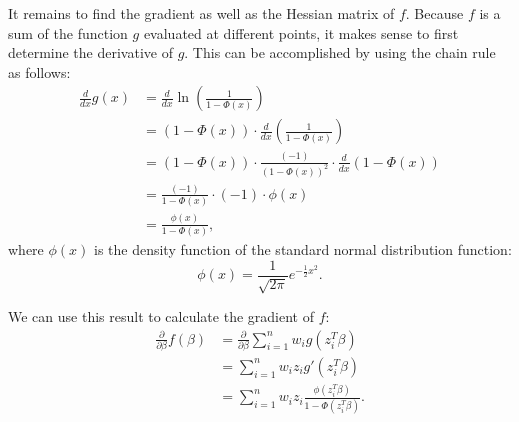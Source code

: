 It remains to find the gradient as well as the Hessian matrix of $f$.
Because $f$ is a sum of the function $g$ evaluated at different points,
it makes sense to first determine the derivative of $g$.
This can be accomplished by using the chain rule as follows:
\begin{equation}
    \begin{split}
        \frac{d}{dx}g(x)
        & = \frac{d}{dx} \ln \left(\frac{1}{1 - \Phi(x)}\right)                 \\
        & = (1 - \Phi(x)) \cdot \frac{d}{dx} \left(\frac{1}{1 - \Phi(x)}\right) \\
        & = (1 - \Phi(x)) \cdot \frac{(-1)}{(1 - \Phi(x))^2} \cdot \frac{d}{dx} (1 - \Phi(x)) \\
        & = \frac{(-1)}{1 - \Phi(x)} \cdot (-1) \cdot \phi(x) \\
        & = \frac{\phi(x)}{1 - \Phi(x)},
    \end{split}
\end{equation}
where $\phi(x)$ is the density function of the standard normal distribution function:
\begin{equation*}
    \phi(x) = \frac{1}{\sqrt{2 \pi}} e^{-\frac{1}{2} x^2}.
\end{equation*}

\noindent We can use this result to calculate the gradient of $f$:
\begin{equation}
    \begin{split}
        \frac{\partial}{\partial \beta} f(\beta)
        & = \frac{\partial}{\partial \beta} \sum_{i=1}^n w_i g(z_i^T \beta) \\
        & = \sum_{i=1}^n w_i z_i g'(z_i^T \beta) \\
        & = \sum_{i=1}^n w_i z_i \frac{\phi(z_i^T \beta)}{1 - \Phi(z_i^T \beta)}.
    \end{split}
\end{equation}

